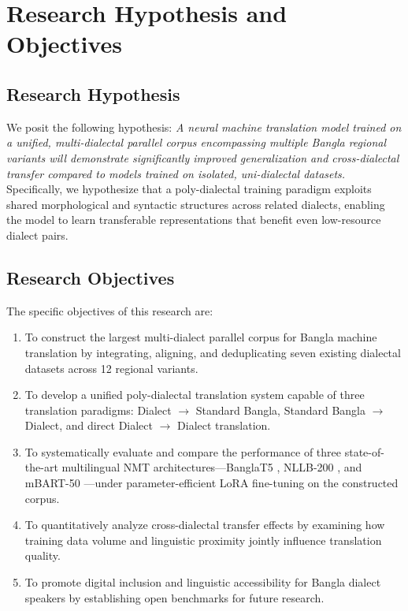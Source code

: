 \documentclass[12pt,a4paper]{article}
\begin{document}
\newpage

\section{Research Hypothesis and Objectives}

\subsection{Research Hypothesis}
We posit the following hypothesis: \textit{A neural machine translation model trained on a unified, multi-dialectal parallel corpus encompassing multiple Bangla regional variants will demonstrate significantly improved generalization and cross-dialectal transfer compared to models trained on isolated, uni-dialectal datasets.} Specifically, we hypothesize that a poly-dialectal training paradigm exploits shared morphological and syntactic structures across related dialects, enabling the model to learn transferable representations that benefit even low-resource dialect pairs.

\subsection{Research Objectives}
The specific objectives of this research are:
\begin{enumerate}
    \item To construct the largest multi-dialect parallel corpus for Bangla machine translation by integrating, aligning, and deduplicating seven existing dialectal datasets across 12 regional variants.
    \item To develop a unified poly-dialectal translation system capable of three translation paradigms: Dialect $\rightarrow$ Standard Bangla, Standard Bangla $\rightarrow$ Dialect, and direct Dialect $\rightarrow$ Dialect translation.
    \item To systematically evaluate and compare the performance of three state-of-the-art multilingual NMT architectures---BanglaT5 \cite{bhattacharjee-etal-2023-banglanlg}, NLLB-200 \cite{nllb2022}, and mBART-50 \cite{tang2020multilingual}---under parameter-efficient LoRA \cite{hu2021lora} fine-tuning on the constructed corpus.
    \item To quantitatively analyze cross-dialectal transfer effects by examining how training data volume and linguistic proximity jointly influence translation quality.
    \item To promote digital inclusion and linguistic accessibility for Bangla dialect speakers by establishing open benchmarks for future research.
\end{enumerate}
\end{document}
